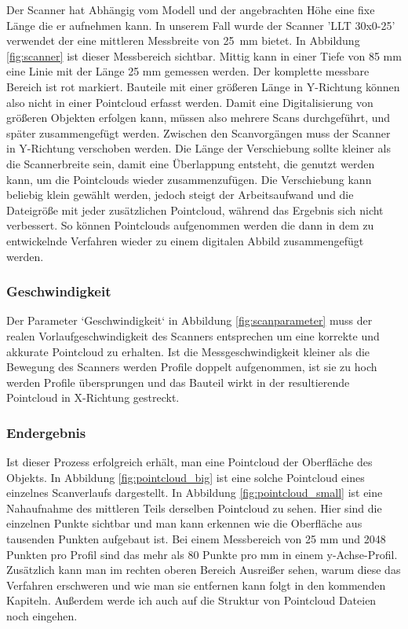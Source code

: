 \documentclass[../main.tex]{subfiles}
\begin{document}
Der Scanner hat Abhängig vom Modell und der angebrachten Höhe eine fixe Länge die 
er aufnehmen kann. In unserem Fall wurde der Scanner 'LLT 30x0-25' verwendet der 
eine mittleren Messbreite von 25 mm bietet. 
In Abbildung \ref{fig:scanner} ist dieser Messbereich sichtbar. Mittig kann 
in einer Tiefe von 85 mm eine Linie mit der Länge 25 mm gemessen werden. 
Der komplette messbare Bereich ist rot markiert. \cite{MESSTECHNIK_2020}
Bauteile mit einer größeren Länge in Y-Richtung können also nicht in einer Pointcloud
erfasst werden. Damit eine Digitalisierung von größeren Objekten erfolgen kann, müssen
also mehrere Scans durchgeführt, und später zusammengefügt werden. Zwischen den 
Scanvorgängen muss der Scanner in Y-Richtung verschoben werden.
Die Länge der Verschiebung sollte 
kleiner als die Scannerbreite sein, damit eine Überlappung entsteht, die 
genutzt werden kann, um die Pointclouds wieder zusammenzufügen. Die Verschiebung kann 
beliebig klein gewählt werden, jedoch steigt der Arbeitsaufwand und die Dateigröße mit 
jeder zusätzlichen Pointcloud, während das Ergebnis sich nicht verbessert.
So können Pointclouds aufgenommen werden die dann in dem zu entwickelnde Verfahren
wieder zu einem digitalen Abbild zusammengefügt werden.


\subsubsection{Geschwindigkeit}
Der Parameter `Geschwindigkeit` in Abbildung \ref{fig:scanparameter} muss der realen Vorlaufgeschwindigkeit des Scanners
entsprechen um eine korrekte und akkurate Pointcloud zu erhalten. Ist die 
Messgeschwindigkeit kleiner als die Bewegung des Scanners werden Profile doppelt 
aufgenommen, ist sie zu hoch werden Profile übersprungen und das Bauteil wirkt in 
der resultierende Pointcloud in X-Richtung gestreckt.


\newpage
\subsubsection{Endergebnis}

Ist dieser Prozess erfolgreich
erhält, man eine Pointcloud der Oberfläche des Objekts. 
In Abbildung \ref{fig:pointcloud_big} ist eine solche Pointcloud eines einzelnes
Scanverlaufs dargestellt. In Abbildung \ref{fig:pointcloud_small} ist eine Nahaufnahme 
des mittleren Teils derselben Pointcloud zu sehen.
Hier sind die einzelnen Punkte sichtbar und man kann erkennen wie die Oberfläche 
aus tausenden Punkten aufgebaut ist. Bei einem Messbereich von 25 mm und 2048 
Punkten pro Profil \cite{SCANNER} sind das mehr als 80 Punkte pro mm in einem
y-Achse-Profil.
Zusätzlich kann man im rechten oberen 
Bereich Ausreißer sehen, warum diese das Verfahren erschweren und 
wie man sie entfernen kann folgt in den kommenden Kapiteln. Außerdem werde ich auch
auf die Struktur von Pointcloud Dateien noch eingehen.
\end{document}
